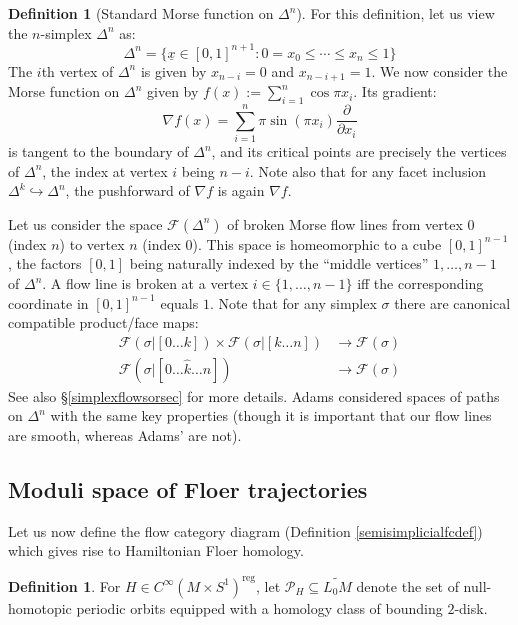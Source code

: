 \documentclass[12pt]{article}
\theoremstyle{definition}
\newtheorem{definition}[theorem]{Definition}
\theoremstyle{remark}
\numberwithin{equation}{subsection}
\newcommand{\F}{\mathcal F}
\newcommand{\PPP}{\mathcal P}
\newcommand{\reg}{\mathrm{reg}}
\begin{document}
\begin{definition}[Standard Morse function on $\Delta^n$]\label{simplexflows}
For this definition, let us view the $n$-simplex $\Delta^n$ as:
\begin{equation}
\Delta^n=\{\underline x\in[0,1]^{n+1}:0=x_0\leq\cdots\leq x_n\leq 1\}
\end{equation}
The $i$th vertex of $\Delta^n$ is given by $x_{n-i}=0$ and $x_{n-i+1}=1$.  We now consider the Morse function on $\Delta^n$ given by $f(x):=\sum_{i=1}^n\cos\pi x_i$.  Its gradient:
\begin{equation}\label{simplexmorsefunctiongradient}
\nabla f(x)=\sum_{i=1}^n\pi\sin(\pi x_i)\frac\partial{\partial x_i}
\end{equation}
is tangent to the boundary of $\Delta^n$, and its critical points are precisely the vertices of $\Delta^n$, the index at vertex $i$ being $n-i$.  Note also that for any facet inclusion $\Delta^k\hookrightarrow\Delta^n$, the pushforward of $\nabla f$ is again $\nabla f$.

Let us consider the space $\F(\Delta^n)$ of broken Morse flow lines from vertex $0$ (index $n$) to vertex $n$ (index $0$).  This space is homeomorphic to a cube $[0,1]^{n-1}$, the factors $[0,1]$ being naturally indexed by the ``middle vertices'' $1,\ldots,n-1$ of $\Delta^n$.  A flow line is broken at a vertex $i\in\{1,\ldots,n-1\}$ iff the corresponding coordinate in $[0,1]^{n-1}$ equals $1$.  Note that for any simplex $\sigma$ there are canonical compatible product/face maps:
\begin{align}
\label{Fproduct}\F(\sigma|[0\ldots k])\times\F(\sigma|[k\ldots n])&\to\F(\sigma)\\
\label{Fface}\F(\sigma|[0\ldots\hat k\ldots n])&\to\F(\sigma)
\end{align}
See also \S\ref{simplexflowsorsec} for more details.  Adams \cite{adamscobar} considered spaces of paths on $\Delta^n$ with the same key properties (though it is important that our flow lines are smooth, whereas Adams' are not).
\end{definition}

\subsection{Moduli space of Floer trajectories}

Let us now define the flow category diagram (Definition \ref{semisimplicialfcdef}) which gives rise to Hamiltonian Floer homology.

\begin{definition}
For $H\in C^\infty(M\times S^1)^\reg$, let $\PPP_H\subseteq\widetilde{L_0M}$ denote the set of null-homotopic periodic orbits equipped with a homology class of bounding $2$-disk.
\end{definition}
\end{document}
